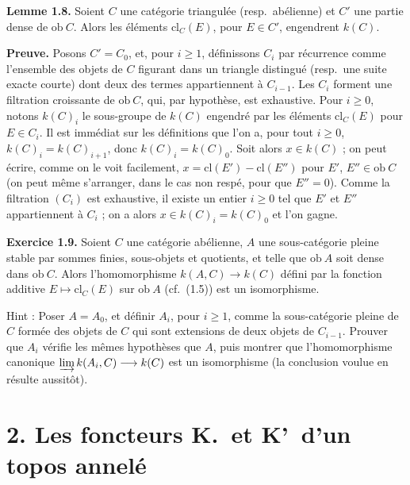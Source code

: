 \medskip

\noindent\textbf{Lemme 1.8.} Soient $C$ une cat\'{e}gorie triangul\'{e}e (resp.\ ab\'{e}lienne) et $C'$ une partie dense de $\mathrm{ob}\ C$. Alors les \'{e}l\'{e}ments $\mathrm{cl}_C(E)$, pour $E \in C'$, engendrent $k(C)$.

\medskip

\noindent\textbf{Preuve.} Posons $C' = C_0$, et, pour $i \geq 1$, d\'{e}finissons $C_i$ par r\'{e}currence comme l'ensemble des objets de $C$ figurant dans un triangle distingu\'{e} (resp.\ une suite exacte courte) dont deux des termes appartiennent \`{a} $C_{i-1}$. Les $C_i$ forment une filtration croissante de $\mathrm{ob}\ C$, qui, par hypoth\`{e}se, est exhaustive. Pour $i \geq 0$, notons $k(C)_i$ le sous-groupe de $k(C)$ engendr\'{e} par les \'{e}l\'{e}ments $\mathrm{cl}_C(E)$ pour $E \in C_i$. Il est imm\'{e}diat sur les d\'{e}finitions que l'on a, pour tout $i \geq 0$, $k(C)_i = k(C)_{i+1}$, donc $k(C)_i = k(C)_0$. Soit alors $x \in k(C)$ ; on peut \'{e}crire, comme on le voit facilement, $x = \mathrm{cl}(E') - \mathrm{cl}(E'')$ pour $E'$, $E'' \in \mathrm{ob}\ C$ (on peut m\^{e}me s'arranger, dans le cas non resp\'{e}, pour que $E'' = 0$). Comme la filtration $(C_i)$ est exhaustive, il existe un entier $i \geq 0$ tel que $E'$ et $E''$ appartiennent \`{a} $C_i$ ; on a alors $x \in k(C)_i = k(C)_0$ et l'on gagne.

\medskip

\noindent\textbf{Exercice 1.9.} Soient $C$ une cat\'{e}gorie ab\'{e}lienne, $A$ une sous-cat\'{e}gorie pleine stable par sommes finies, sous-objets et quotients, et telle que $\mathrm{ob}\ A$ soit dense dans $\mathrm{ob}\ C$. Alors l'homomorphisme $k(A,C) \longrightarrow k(C)$ d\'{e}fini par la fonction additive $E \longmapsto \mathrm{cl}_C(E)$ sur $\mathrm{ob}\ A$ (cf.\ (1.5)) est un isomorphisme.

Hint : Poser $A = A_0$, et d\'{e}finir $A_i$, pour $i \geq 1$, comme la sous-cat\'{e}gorie pleine de $C$ form\'{e}e des objets de $C$ qui sont extensions de deux objets de $C_{i-1}$. Prouver que $A_i$ v\'{e}rifie les m\^{e}mes hypoth\`{e}ses que $A$, puis montrer que l'homomorphisme canonique $\varinjlim k(A_i, C) \longrightarrow k(C)$ est un isomorphisme (la conclusion voulue en r\'{e}sulte aussit\^{o}t).

\newpage

\section*{2. Les foncteurs K.\ et K'\ d'un topos annel\'{e}}

